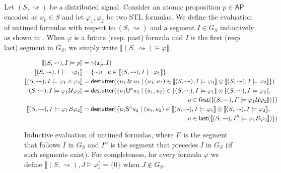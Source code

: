 \documentclass[iicol,lineno]{sn-jnl}
\renewcommand{\cref}{\Cref}
\newcommand{\first}{\textsf{first}}
\newcommand{\last}{\textsf{last}}
\newcommand{\hb}{\rightsquigarrow}
\newcommand{\AP}{\mathsf{AP}}
\newcommand{\destutter}{\mathsf{destutter}}
\newcommand*\BitAnd{\mathbin{\&}}
\newcommand*\BitNeg{\ensuremath{\mathord{\sim}}}
\def\until{\kern.1em\mathcal{U}}
\def\since{\kern.1em\mathcal{S}}
\newcommand{\?}{\text{?}}
\newcommand{\suchthat}{\;\ifnum\currentgrouptype=16 \middle\fi|\;}
\let\st\suchthat
\begin{document}
	Let  $(S, {\hb})$ be a distributed signal.
	Consider an atomic proposition $p \in \AP$ encoded as $x_p \in S$ and let $\varphi_1, \varphi_2$ be two STL formulas.
	We define the evaluation of untimed formulas with respect to $(S, {\hb})$ and a segment $I \in G_S$ inductively as shown in \cref{fig:eval}.
	When $\varphi$ is a future (resp. past) formula and $I$ is the first (resp. last) segment in $G_S$, we simply write $\llbracket (S, {\hb}) \models \varphi \rrbracket$.
	
	\begin{figure}[!t]
		\begin{align*}
			\llbracket (S, {\hb}), I \models p \rrbracket &= \gamma(x_p, I) \\
			\llbracket (S, {\hb}), I \models \lnot \varphi_1 \rrbracket &= \{\BitNeg u \st u \in  \llbracket (S, {\hb}), I \models \varphi_1 \rrbracket \} \\
			\llbracket (S, {\hb}), I \models \varphi_1 \land \varphi_2 \rrbracket &= \destutter(\{ u_1 \BitAnd u_2 \st (u_1, u_2) \in \llbracket (S, {\hb}), I \models \varphi_1 \rrbracket \otimes \llbracket (S, {\hb}), I \models \varphi_2 \rrbracket  \}) \\
			\llbracket (S, {\hb}), I \models \varphi_1 \until \varphi_2 \rrbracket &= \destutter(\{ u_1 \mathsf{U}^a u_2 \st (u_1, u_2) \in \llbracket (S, {\hb}), I \models \varphi_1 \rrbracket \otimes \llbracket (S, {\hb}), I \models \varphi_2 \rrbracket, \\
			&\hspace{17em} a \in \first(\llbracket (S, {\hb}), I' \models \varphi_1 \until \varphi_2 \rrbracket) \}) \\
			\llbracket (S, {\hb}), I \models \varphi_1 \since \varphi_2 \rrbracket &= \destutter(\{ u_1 \mathsf{S}^a u_2 \st (u_1, u_2) \in \llbracket (S, {\hb}), I \models \varphi_1 \rrbracket \otimes \llbracket (S, {\hb}), I \models \varphi_2 \rrbracket, \\
			&\hspace{17em} a \in \last(\llbracket (S, {\hb}), I'' \models \varphi_1 \since \varphi_2 \rrbracket) \})
		\end{align*}
		\caption{Inductive evaluation of untimed formulas, where $I'$ is the segment that follows $I$ in $G_S$  and  $I''$ is the segment that precedes $I$ in $G_S$ (if such segments exist). For completeness, for every formula $\varphi$ we define $\llbracket (S, {\hb}), J \models \varphi \rrbracket = \{0\}$ when $J \notin G_S$. \label{fig:eval}}
	\end{figure}
	
\end{document}
